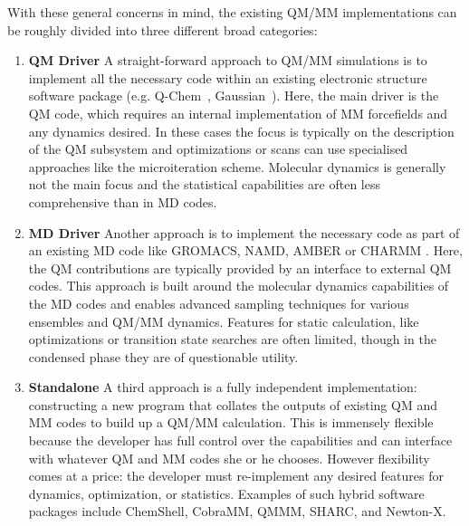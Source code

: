 \documentclass[journal=jctcce,manuscript=article,layout=traditional]{achemso}
\begin{document}
With these general concerns in  mind, the existing QM/MM implementations can be roughly divided into three different broad categories:

\begin{enumerate}
\item \label{scheme:qm} \textbf{QM Driver} A straight-forward approach to QM/MM simulations is to implement all the necessary code within an existing electronic structure software package (e.g. Q-Chem~\cite{qchem}, Gaussian~\cite{g16b01}).
Here, the main driver is the QM code, which requires an internal implementation of MM forcefields and any dynamics desired.
In these cases the focus is typically on the description of the QM subsystem and optimizations or scans can use specialised approaches like the microiteration scheme\cite{kastner_exploiting_2007}.
Molecular dynamics is generally not the main focus and the statistical capabilities are often less comprehensive than in MD codes.

\item \label{scheme:md}\textbf{MD Driver} Another approach is to implement the necessary code as part of an existing MD code like GROMACS\cite{gromacs45}, NAMD,\cite{melo_namd_2018} AMBER\cite{Walker2008, Goetz2014} or CHARMM \cite{Charmm}.
Here, the QM contributions are typically provided by an interface to external QM codes. This approach is built around the molecular dynamics capabilities of the MD codes and enables advanced sampling techniques for various ensembles and QM/MM dynamics.
Features for static calculation, like optimizations or transition state searches are often limited, though in the condensed phase they are of questionable utility.

\item \label{scheme:standalone} \textbf{Standalone} A third approach is a fully independent implementation: constructing a new program that collates the outputs of existing QM and MM codes to build up a QM/MM calculation.
This is immensely flexible because  the developer has full control over the capabilities and can interface with whatever QM and MM codes she or he chooses.
However flexibility comes at a price: the developer must re-implement any desired features for dynamics, optimization, or statistics.
Examples of such hybrid software packages include ChemShell\cite{QUASI, ChemShell, PyChemShell}, CobraMM\cite{CobraMM2007, CobraMM2018}, QMMM\cite{QMMM2018}, SHARC\cite{Richter2011, Mai2018}, and Newton-X\cite{Newtonx, NewtonxQMMM}.
%
\end{enumerate}
\end{document}
